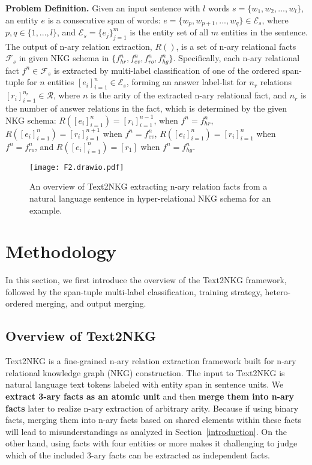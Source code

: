 \documentclass{article} \usepackage{iclr2024_conference,times}
\begin{document}
\textbf{Problem Definition. }
Given an input sentence with $l$ words $s=\{w_1,w_2,...,w_l\}$, an entity $e$ is a consecutive span of words: $e=\{w_p,w_{p+1},...,w_q\}\in \mathcal{E}_s$, where $p,q\in\{1,...,l\}$, and $\mathcal{E}_s=\{e_j\}_{j=1}^m$ is the entity set of all $m$ entities in the sentence. The output of n-ary relation extraction, $R()$, is a set of n-ary relational facts $\mathcal{F}_s$ in given NKG schema in $\{f^n_{hr},f^n_{ev},f^n_{ro},f^n_{hg}\}$. Specifically, each n-ary relational fact $f^n \in \mathcal{F}_s$ is extracted by multi-label classification of one of the ordered span-tuple for $n$ entities $[e_i]_{i=1}^n\in\mathcal{E}_s$, forming an answer label-list for $n_r$ relations $[r_i]_{i=1}^{n_r}\in\mathcal{R}$, where $n$ is the arity of the extracted n-ary relational fact, and $n_r$ is the number of answer relations in the fact, which is determined by the given NKG schema: $R([e_i]_{i=1}^n)=[r_i]_{i=1}^{n-1}$, when $f^n=f^n_{hr}$, $R([e_i]_{i=1}^n)=[r_i]_{i=1}^{n+1}$ when $f^n=f^n_{ev}$, $R([e_i]_{i=1}^n)=[r_i]_{i=1}^{n}$ when $f^n=f^n_{ro}$, and $R([e_i]_{i=1}^n)=[r_1]$ when $f^n=f^n_{hg}$.


\begin{figure*}[t]
\centering
\texttt{[image: F2.drawio.pdf]}
\caption{An overview of Text2NKG extracting n-ary relation facts from a natural language sentence in hyper-relational NKG schema for an example. }
\label{f2}
\end{figure*}


\section{Methodology}
In this section, we first introduce the overview of the Text2NKG framework, followed by the span-tuple multi-label classification, training strategy, hetero-ordered merging, and output merging.

\subsection{Overview of Text2NKG}
Text2NKG is a fine-grained n-ary relation extraction framework built for n-ary relational knowledge graph (NKG) construction. The input to Text2NKG is natural language text tokens labeled with entity span in sentence units. We \textbf{extract 3-ary facts as an atomic unit} and then \textbf{merge them into n-ary facts} later to realize n-ary extraction of arbitrary arity. Because if using binary facts, merging them into n-ary facts based on shared elements within these facts will lead to misunderstandings as analyzed in Section~\ref{introduction}. On the other hand, using facts with four entities or more makes it challenging to judge which of the included 3-ary facts can be extracted as independent facts.
\end{document}
